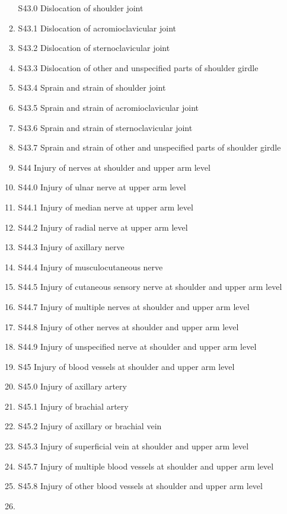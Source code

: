 \documentclass[
]{scrartcl}
\begin{document}
\begin{itemize}
\begin{enumerate}
    S43.0 Dislocation of shoulder joint
  \item
    S43.1 Dislocation of acromioclavicular joint
  \item
    S43.2 Dislocation of sternoclavicular joint
  \item
    S43.3 Dislocation of other and unspecified parts of shoulder girdle
  \item
    S43.4 Sprain and strain of shoulder joint
  \item
    S43.5 Sprain and strain of acromioclavicular joint
  \item
    S43.6 Sprain and strain of sternoclavicular joint
  \item
    S43.7 Sprain and strain of other and unspecified parts of shoulder
    girdle
  \item
    S44 Injury of nerves at shoulder and upper arm level
  \item
    S44.0 Injury of ulnar nerve at upper arm level
  \item
    S44.1 Injury of median nerve at upper arm level
  \item
    S44.2 Injury of radial nerve at upper arm level
  \item
    S44.3 Injury of axillary nerve
  \item
    S44.4 Injury of musculocutaneous nerve
  \item
    S44.5 Injury of cutaneous sensory nerve at shoulder and upper arm
    level
  \item
    S44.7 Injury of multiple nerves at shoulder and upper arm level
  \item
    S44.8 Injury of other nerves at shoulder and upper arm level
  \item
    S44.9 Injury of unspecified nerve at shoulder and upper arm level
  \item
    S45 Injury of blood vessels at shoulder and upper arm level
  \item
    S45.0 Injury of axillary artery
  \item
    S45.1 Injury of brachial artery
  \item
    S45.2 Injury of axillary or brachial vein
  \item
    S45.3 Injury of superficial vein at shoulder and upper arm level
  \item
    S45.7 Injury of multiple blood vessels at shoulder and upper arm
    level
  \item
    S45.8 Injury of other blood vessels at shoulder and upper arm level
  \item

\end{enumerate}
\end{itemize}
\end{document}
